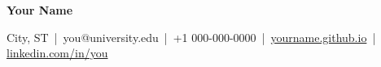 \begin{center}
{\color{accent}\LARGE\bfseries Your Name}\par\vspace{2pt}
City, ST \,|\, you@university.edu \,|\, +1 000-000-0000 \,|\, \href{https://yourname.github.io}{yourname.github.io} \,|\, \href{https://www.linkedin.com/in/you}{linkedin.com/in/you}
\end{center}

